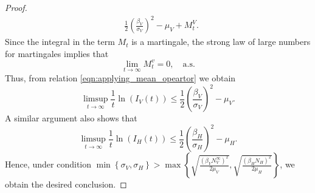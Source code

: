 \begin{proof}
\begin{equation}
\begin{aligned}
                &
            \frac{1}{2}
            \left(
                \frac{\beta_V}{\sigma_V}
            \right) ^ 2
            -
            \mu_V 
            + 
            M_t ^ V.
        \end{aligned}
    \end{equation}
    Since the integral in the term $M_t$ is a martingale, 
    the strong law of large numbers for martingales 
    {\citet[p. 12, Thm 3.4]{Mao2007}} implies that
    $$
        \lim_{t \to \infty} M_t ^ v = 0, \quad \text{a.s.}
    $$
    Thus, from relation \eqref{eqn:applying_mean_opeartor} 
    we obtain
    \begin{equation} \label{eqn:bound_vector_noise_V}
        \limsup_{t \to \infty} 
            \frac{1}{t}
            \ln(I_V(t)) 
            \leq
            \frac{1}{2}
            \left(
                \frac{\beta_V}{\sigma_V}
            \right) ^ 2
             - \mu_V.
    \end{equation}
    A similar argument also shows that
        \begin{equation}\label{eqn:bound_vector_noise_H}
            \limsup_{t \to \infty} 
                \frac{1}{t}
                \ln(I_H(t)) 
                \leq
                \frac{1}{2}
                \left(
                    \frac{\beta_H}{\sigma_H}
                \right) ^ 2
                - \mu_H.
        \end{equation}
    Hence, under condition
        $
            \displaystyle
            \min
                \left \{
                      \sigma_V, \sigma_H 
                \right\} 
                > 
            \max 
            \left \{
                \sqrt{\frac{(\beta_V N_V ^ {\infty}) ^ 2}{2 \mu_V}},
                \sqrt{\frac{(\beta_H N_H) ^ 2}{2 \mu_H}}
            \right \}
        $, 
    we obtain the desired conclusion.
\end{proof}
%
%
%
